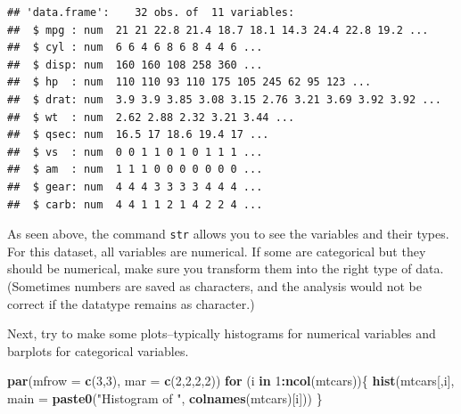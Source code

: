 \documentclass[
]{book}
\newenvironment{Shaded}{\begin{snugshade}}{\end{snugshade}}
\newcommand{\AttributeTok}[1]{\textcolor[rgb]{0.13,0.29,0.53}{#1}}
\newcommand{\ControlFlowTok}[1]{\textcolor[rgb]{0.13,0.29,0.53}{\textbf{#1}}}
\newcommand{\DecValTok}[1]{\textcolor[rgb]{0.00,0.00,0.81}{#1}}
\newcommand{\FunctionTok}[1]{\textcolor[rgb]{0.13,0.29,0.53}{\textbf{#1}}}
\newcommand{\NormalTok}[1]{#1}
\newcommand{\SpecialCharTok}[1]{\textcolor[rgb]{0.81,0.36,0.00}{\textbf{#1}}}
\newcommand{\StringTok}[1]{\textcolor[rgb]{0.31,0.60,0.02}{#1}}
\begin{document}
\begin{verbatim}
## 'data.frame':    32 obs. of  11 variables:
##  $ mpg : num  21 21 22.8 21.4 18.7 18.1 14.3 24.4 22.8 19.2 ...
##  $ cyl : num  6 6 4 6 8 6 8 4 4 6 ...
##  $ disp: num  160 160 108 258 360 ...
##  $ hp  : num  110 110 93 110 175 105 245 62 95 123 ...
##  $ drat: num  3.9 3.9 3.85 3.08 3.15 2.76 3.21 3.69 3.92 3.92 ...
##  $ wt  : num  2.62 2.88 2.32 3.21 3.44 ...
##  $ qsec: num  16.5 17 18.6 19.4 17 ...
##  $ vs  : num  0 0 1 1 0 1 0 1 1 1 ...
##  $ am  : num  1 1 1 0 0 0 0 0 0 0 ...
##  $ gear: num  4 4 4 3 3 3 3 4 4 4 ...
##  $ carb: num  4 4 1 1 2 1 4 2 2 4 ...
\end{verbatim}

As seen above, the command \texttt{str} allows you to see the variables and their types. For this dataset, all variables are numerical. If some are categorical but they should be numerical, make sure you transform them into the right type of data. (Sometimes numbers are saved as characters, and the analysis would not be correct if the datatype remains as character.)

Next, try to make some plots--typically histograms for numerical variables and barplots for categorical variables.

\begin{Shaded}
\begin{Highlighting}[]
\FunctionTok{par}\NormalTok{(}\AttributeTok{mfrow =} \FunctionTok{c}\NormalTok{(}\DecValTok{3}\NormalTok{,}\DecValTok{3}\NormalTok{), }\AttributeTok{mar =} \FunctionTok{c}\NormalTok{(}\DecValTok{2}\NormalTok{,}\DecValTok{2}\NormalTok{,}\DecValTok{2}\NormalTok{,}\DecValTok{2}\NormalTok{))}
\ControlFlowTok{for}\NormalTok{ (i }\ControlFlowTok{in} \DecValTok{1}\SpecialCharTok{:}\FunctionTok{ncol}\NormalTok{(mtcars))\{}
  \FunctionTok{hist}\NormalTok{(mtcars[,i], }\AttributeTok{main =} \FunctionTok{paste0}\NormalTok{(}\StringTok{"Histogram of "}\NormalTok{, }\FunctionTok{colnames}\NormalTok{(mtcars)[i]))}
\NormalTok{\}}
\end{Highlighting}
\end{Shaded}
\end{document}
